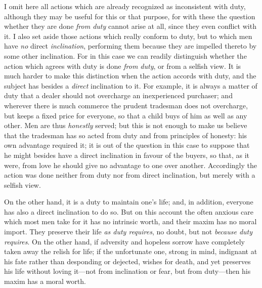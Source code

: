 I omit here all actions which are already recognized as inconsistent
with duty, although they may be useful for this or that purpose, for
with these the question whether they are done \textit{from duty}
cannot arise at all, since they even conflict with it. I also set
aside those actions which really conform to duty, but to which men
have \textit{no} direct \textit{inclination}, performing them because
they are impelled thereto by some other inclination. For in this
case we can readily distinguish whether the action which agrees with
duty is done \textit{from duty}, or from a selfish view. It is much
harder to make this distinction when the action accords with duty, and
the subject has besides a \textit{direct} inclination to it. For
example, it is always a matter of duty that a dealer should not
overcharge an inexperienced purchaser; and wherever there is much
commerce the prudent tradesman does not overcharge, but keeps a fixed
price for everyone, so that a child buys of him as well as any other.
Men are thus \textit{honestly} served; but this is not enough to make
us believe that the tradesman has so acted from duty and from
principles of honesty: his own advantage required it; it is out of the
question in this case to suppose that he might besides have a direct
inclination in favour of the buyers, so that, as it were, from love he
should give no advantage to one over another. Accordingly the action
was done neither from duty nor from direct inclination, but merely
with a selfish view.

On the other hand, it is a duty to maintain one's life; and, in
addition, everyone has also a direct inclination to do so. But on this
account the often anxious care which most men take for  it
has no intrinsic worth, and their maxim has no moral import. They
preserve their life \textit{as duty requires}, no doubt, but not
\textit{because duty requires}. On the other hand, if adversity and
hopeless sorrow have completely taken away the relish for life; if the
unfortunate one, strong in mind, indignant at his fate rather than
desponding or dejected, wishes for death, and yet preserves his life
without loving it---not from inclination or fear, but from duty---then
his maxim has a moral worth.

